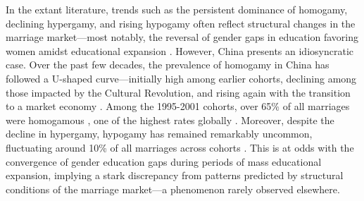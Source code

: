 In the extant literature, trends such as the persistent dominance of homogamy, declining hypergamy, and rising hypogamy often reflect structural changes in the marriage market—most notably, the reversal of gender gaps in education favoring women amidst educational expansion \parencite{dehauwReversedGenderGap2017,eratEducationalAssortativeMating2021,esteveGenderGapReversalEducation2012,esteveEndHypergamyGlobal2016,schwartzTrendsEducationalAssortative2005}. However, China presents an idiosyncratic case. Over the past few decades, the prevalence of homogamy in China has followed a U-shaped curve—initially high among earlier cohorts, declining among those impacted by the Cultural Revolution, and rising again with the transition to a market economy \parencite{dongTrendsEducationalAssortative2023,hanTrendsEducationalAssortative2010,shiSevenDecadesEducational2019}. Among the 1995-2001 cohorts, over 65\% of all marriages were homogamous \parencite{hanTrendsEducationalAssortative2010}, one of the highest rates globally \parencite{dehauwReversedGenderGap2017,eratEducationalAssortativeMating2021,katrnakChangePrevalencePreference2020}. Moreover, despite the decline in hypergamy, hypogamy has remained remarkably uncommon, fluctuating around 10\% of all marriages across cohorts \parencite{hanTrendsEducationalAssortative2010}. This is at odds with the convergence of gender education gaps during periods of mass educational expansion, implying a stark discrepancy from patterns predicted by structural conditions of the marriage market—a phenomenon rarely observed elsewhere.

